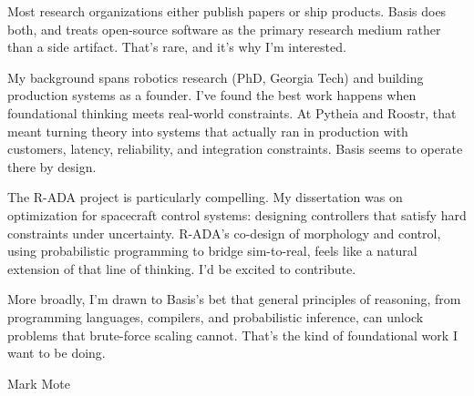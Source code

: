 \documentclass[11pt]{article}
\begin{document}
Most research organizations either publish papers or ship products. Basis does both, and treats open-source software as the primary research medium rather than a side artifact. That's rare, and it's why I'm interested.

My background spans robotics research (PhD, Georgia Tech) and building production systems as a founder. I've found the best work happens when foundational thinking meets real-world constraints. At Pytheia and Roostr, that meant turning theory into systems that actually ran in production with customers, latency, reliability, and integration constraints. Basis seems to operate there by design.

The R-ADA project is particularly compelling. My dissertation was on optimization for spacecraft control systems: designing controllers that satisfy hard constraints under uncertainty. R-ADA's co-design of morphology and control, using probabilistic programming to bridge sim-to-real, feels like a natural extension of that line of thinking. I'd be excited to contribute.

More broadly, I'm drawn to Basis's bet that general principles of reasoning, from programming languages, compilers, and probabilistic inference, can unlock problems that brute-force scaling cannot. That's the kind of foundational work I want to be doing.

\vspace{1em}
Mark Mote
\end{document}
